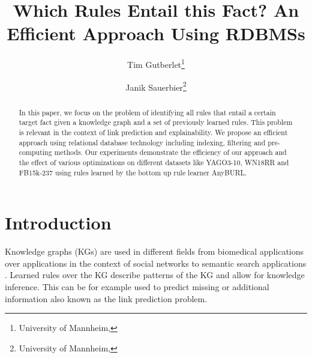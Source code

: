 \documentclass[english]{lni}
\begin{document}
\title[Which Rules Entail this Fact? An Efficient Approach Using RDBMSs]{Which Rules Entail this Fact? An Efficient Approach Using RDBMSs}
\author[Tim Gutberlet \and Janik Sauerbier]
{Tim Gutberlet\footnote{University of Mannheim, } \and
Janik Sauerbier\footnote{University of Mannheim, }}
\maketitle

\begin{abstract}
 In this paper, we focus on the problem of identifying all rules that entail a certain target fact given a knowledge graph and a set of previously learned rules. This problem is relevant in the context of link prediction and explainability. We propose an efficient approach using relational database technology including indexing, filtering and pre-computing methods. Our experiments demonstrate the efficiency of our approach and the effect of various optimizations on different datasets like YAGO3-10, WN18RR and FB15k-237 using rules learned by the bottom up rule learner AnyBURL. 
 
\end{abstract}
\section{Introduction}
Knowledge graphs (KGs) are used in different fields from biomedical applications \cite{OpenBioLink} over applications in the context of social networks \cite{SocialNetworks} to semantic search applications \cite{SemanticSearch}. Learned rules over the KG describe patterns of the KG and allow for knowledge inference. This can be for example used to predict missing or additional information also known as the link prediction problem.
\end{document}
